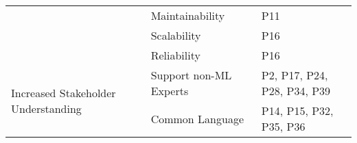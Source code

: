 \begin{table}[htbp]
\begin{tabular}{p{3cm} p{3.5cm} p{8.5cm}}
                                                     
                                                     &\multicolumn{1}{p{2.5cm}}{Maintainability} & \multicolumn{1}{p{8.5cm}}{P11} \TBstrut\\
                                                     & \multicolumn{1}{p{2.5cm}}{Scalability} & \multicolumn{1}{p{8.5cm}}{P16} \TBstrut\\
                                                     & \multicolumn{1}{p{2.5cm}}{Reliability} & \multicolumn{1}{p{8.5cm}}{P16} \TBstrut\\
                                                     
             \hline
             \multirow{2}{3cm}{Increased Stakeholder Understanding}  & \multicolumn{1}{p{3.5cm}}{Support non-ML Experts} & \multicolumn{1}{p{8.5cm}}{P2, P17, P24, P28, P34, P39} \TBstrut\\
                                                     & \multicolumn{1}{p{3.5cm}}{Common Language} & \multicolumn{1}{p{8.5cm}}{P14, P15, P32, P35, P36} \TBstrut\\
            \hline
        \end{tabular}
\end{table} 

